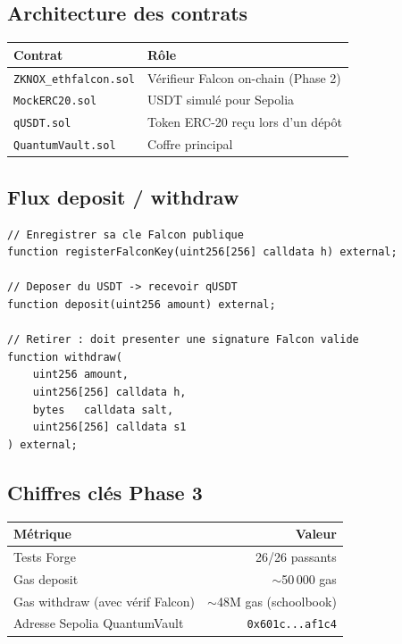 \documentclass[11pt,a4paper]{article}
\begin{document}
\subsection{Architecture des contrats}

\begin{center}
\begin{tabular}{ll}
\toprule
\textbf{Contrat} & \textbf{Rôle} \\
\midrule
\texttt{ZKNOX\_ethfalcon.sol} & Vérifieur Falcon on-chain (Phase 2) \\
\texttt{MockERC20.sol}        & USDT simulé pour Sepolia \\
\texttt{qUSDT.sol}            & Token ERC-20 reçu lors d'un dépôt \\
\texttt{QuantumVault.sol}     & Coffre principal \\
\bottomrule
\end{tabular}
\end{center}

\subsection{Flux deposit / withdraw}

\begin{lstlisting}[style=solidity, caption={Interface simplifiée de QuantumVault}]
// Enregistrer sa cle Falcon publique
function registerFalconKey(uint256[256] calldata h) external;

// Deposer du USDT -> recevoir qUSDT
function deposit(uint256 amount) external;

// Retirer : doit presenter une signature Falcon valide
function withdraw(
    uint256 amount,
    uint256[256] calldata h,
    bytes   calldata salt,
    uint256[256] calldata s1
) external;
\end{lstlisting}

\subsection{Chiffres clés Phase 3}

\begin{center}
\begin{tabular}{lr}
\toprule
\textbf{Métrique} & \textbf{Valeur} \\
\midrule
Tests Forge & 26/26 passants \\
Gas deposit & $\sim$50\,000 gas \\
Gas withdraw (avec vérif Falcon) & $\sim$48M gas (schoolbook) \\
Adresse Sepolia QuantumVault & \texttt{0x601c...af1c4} \\
\bottomrule
\end{tabular}
\end{center}
\end{document}
